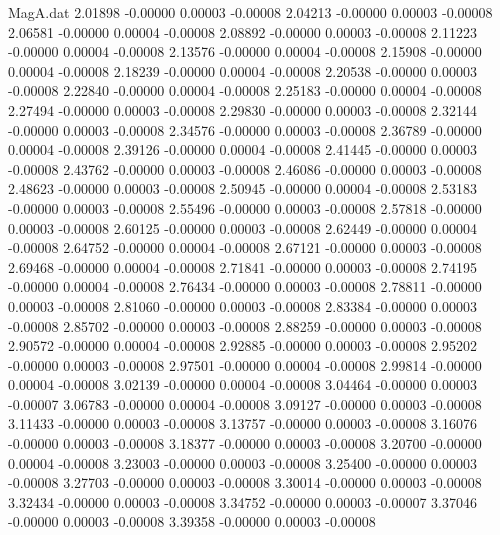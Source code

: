\begin{filecontents}{MagA.dat}
   2.01898   -0.00000    0.00003   -0.00008
   2.04213   -0.00000    0.00003   -0.00008
   2.06581   -0.00000    0.00004   -0.00008
   2.08892   -0.00000    0.00003   -0.00008
   2.11223   -0.00000    0.00004   -0.00008
   2.13576   -0.00000    0.00004   -0.00008
   2.15908   -0.00000    0.00004   -0.00008
   2.18239   -0.00000    0.00004   -0.00008
   2.20538   -0.00000    0.00003   -0.00008
   2.22840   -0.00000    0.00004   -0.00008
   2.25183   -0.00000    0.00004   -0.00008
   2.27494   -0.00000    0.00003   -0.00008
   2.29830   -0.00000    0.00003   -0.00008
   2.32144   -0.00000    0.00003   -0.00008
   2.34576   -0.00000    0.00003   -0.00008
   2.36789   -0.00000    0.00004   -0.00008
   2.39126   -0.00000    0.00004   -0.00008
   2.41445   -0.00000    0.00003   -0.00008
   2.43762   -0.00000    0.00003   -0.00008
   2.46086   -0.00000    0.00003   -0.00008
   2.48623   -0.00000    0.00003   -0.00008
   2.50945   -0.00000    0.00004   -0.00008
   2.53183   -0.00000    0.00003   -0.00008
   2.55496   -0.00000    0.00003   -0.00008
   2.57818   -0.00000    0.00003   -0.00008
   2.60125   -0.00000    0.00003   -0.00008
   2.62449   -0.00000    0.00004   -0.00008
   2.64752   -0.00000    0.00004   -0.00008
   2.67121   -0.00000    0.00003   -0.00008
   2.69468   -0.00000    0.00004   -0.00008
   2.71841   -0.00000    0.00003   -0.00008
   2.74195   -0.00000    0.00004   -0.00008
   2.76434   -0.00000    0.00003   -0.00008
   2.78811   -0.00000    0.00003   -0.00008
   2.81060   -0.00000    0.00003   -0.00008
   2.83384   -0.00000    0.00003   -0.00008
   2.85702   -0.00000    0.00003   -0.00008
   2.88259   -0.00000    0.00003   -0.00008
   2.90572   -0.00000    0.00004   -0.00008
   2.92885   -0.00000    0.00003   -0.00008
   2.95202   -0.00000    0.00003   -0.00008
   2.97501   -0.00000    0.00004   -0.00008
   2.99814   -0.00000    0.00004   -0.00008
   3.02139   -0.00000    0.00004   -0.00008
   3.04464   -0.00000    0.00003   -0.00007
   3.06783   -0.00000    0.00004   -0.00008
   3.09127   -0.00000    0.00003   -0.00008
   3.11433   -0.00000    0.00003   -0.00008
   3.13757   -0.00000    0.00003   -0.00008
   3.16076   -0.00000    0.00003   -0.00008
   3.18377   -0.00000    0.00003   -0.00008
   3.20700   -0.00000    0.00004   -0.00008
   3.23003   -0.00000    0.00003   -0.00008
   3.25400   -0.00000    0.00003   -0.00008
   3.27703   -0.00000    0.00003   -0.00008
   3.30014   -0.00000    0.00003   -0.00008
   3.32434   -0.00000    0.00003   -0.00008
   3.34752   -0.00000    0.00003   -0.00007
   3.37046   -0.00000    0.00003   -0.00008
   3.39358   -0.00000    0.00003   -0.00008

\end{filecontents}
